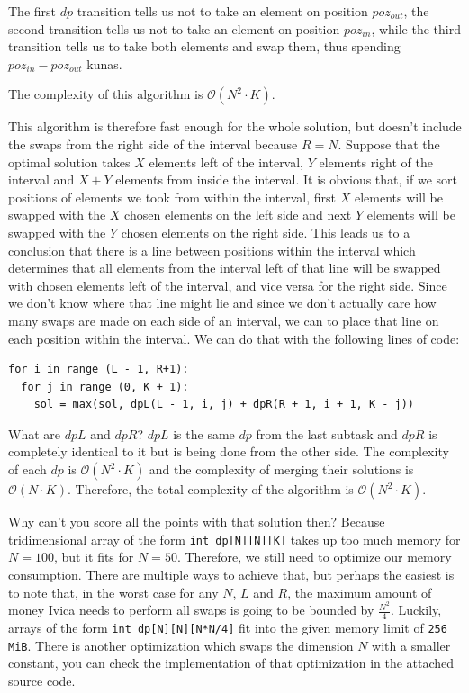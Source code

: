 \documentclass[a4paper]{article}
\begin{document}
The first $dp$ transition tells us not to take an element on position $poz_{out}$,
the second transition tells us not to take an element on position $poz_{in}$, while
the third transition tells us to take both elements and swap them, thus spending
$poz_{in} - poz_{out}$ kunas.

The complexity of this algorithm is $\mathcal{O}(N^2 \cdot K)$.

This algorithm is therefore fast enough for the whole solution, but doesn't
include the swaps from the right side of the interval because $R=N$. Suppose
that the optimal solution takes $X$ elements left of the interval, $Y$ elements
right of the interval and $X+Y$ elements from inside the interval. It is obvious
that, if we sort positions of elements we took from within the interval, first
$X$ elements will be swapped with the $X$ chosen elements on the left side and
next $Y$ elements will be swapped with the $Y$ chosen elements on the right side.
This leads us to a conclusion that there is a line between positions within the
interval which determines that all elements from the interval left of that line
will be swapped with chosen elements left of the interval, and vice versa for
the right side. Since we don't know where that line might lie and since we
don't actually care how many swaps are made on each side of an interval, we
can to place that line on each position within the interval. We can do that
with the following lines of code:

\vspace{-2ex}
\begin{verbatim}
for i in range (L - 1, R+1):
  for j in range (0, K + 1):
    sol = max(sol, dpL(L - 1, i, j) + dpR(R + 1, i + 1, K - j))
\end{verbatim}

What are $dpL$ and $dpR$? $dpL$ is the same $dp$ from the last subtask and
$dpR$ is completely identical to it but is being done from the other side. The
complexity of each $dp$ is $\mathcal{O}(N^2 \cdot K)$ and the complexity of
merging their solutions is $\mathcal{O}(N \cdot K)$. Therefore, the total
complexity of the algorithm is $\mathcal{O}(N^2 \cdot K)$.

Why can't you score all the points with that solution then? Because tridimensional
array of the form \texttt{int dp[N][N][K]} takes up too much memory for $N = 100$, but it
fits for $N=50$. Therefore, we still need to optimize our memory consumption.
There are multiple ways to achieve that, but perhaps the easiest is to note that,
in the worst case for any $N$, $L$ and $R$, the maximum amount of money Ivica
needs to perform all swaps is going to be bounded by $\frac{N^2}{4}$. Luckily,
arrays of the form \texttt{int dp[N][N][N*N/4]} fit into the given memory limit
of \texttt{256 MiB}. There is another optimization which swaps the dimension $N$
with a smaller constant, you can check the implementation of that optimization
in the attached source code.
\end{document}
